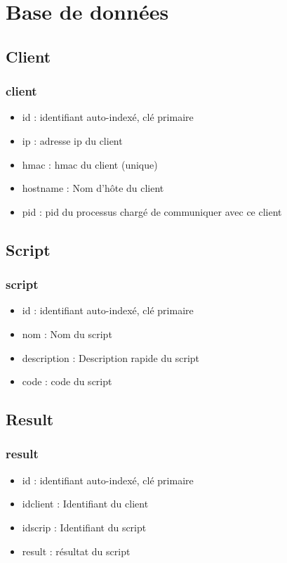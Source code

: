 \section{Base de données}

\subsection{Client}
		\begin{frame}
		    \frametitle{\textbf{client}}
			\begin{itemize}
				\item id : identifiant auto-indexé, clé primaire
				\item ip : adresse ip du client
				\item hmac : hmac du client (unique)
				\item hostname : Nom d'hôte du client
				\item pid : pid du processus chargé de communiquer avec ce client
			\end{itemize}
		\end{frame}

\subsection{Script}
	\begin{frame}
		\frametitle{\textbf{script}}
		\begin{itemize}
				\item id : identifiant auto-indexé, clé primaire
				\item nom : Nom du script
				\item description : Description rapide du script
				\item code : code du script
		\end{itemize}
	\end{frame}

\subsection{Result}
	\begin{frame}
		\frametitle{\textbf{result}}
		\begin{itemize}
				\item id : identifiant auto-indexé, clé primaire
				\item idclient : Identifiant du client
				\item idscrip : Identifiant du script
				\item result : résultat du script
		\end{itemize}
	\end{frame}


